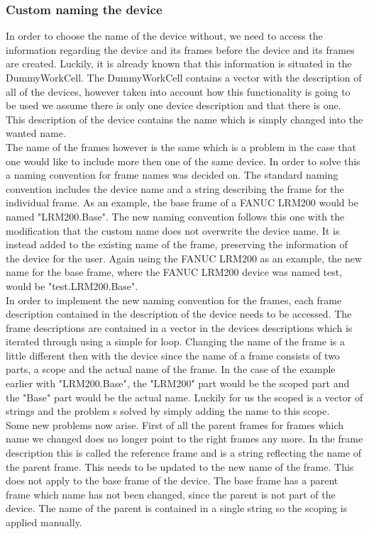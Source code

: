 \subsubsection{Custom naming the device}
In order to choose the name of the device without, we need to access the information regarding the device and its frames before the device and its frames are created. Luckily, it is already known that this information is situated in the DummyWorkCell. The DummyWorkCell contains a vector with the description of all of the devices, however taken into account how this functionality is going to be used we assume there is only one device description and that there is one. This description of the device contains the name which is simply changed into the wanted name.\\

The name of the frames however is the same which is a problem in the case that one would like to include more then one of the same device. In order to solve this a naming convention for frame names was decided on. The standard naming convention includes the device name and a string describing the frame for the individual frame. As an example, the base frame of a FANUC LRM200 would be named "LRM200.Base". The new naming convention follows this one with the modification that the custom name does not overwrite the device name. It is instead added to the existing name of the frame, preserving the information of the device for the user. Again using the FANUC LRM200 as an example, the new name for the base frame, where the FANUC LRM200 device was named test, would be "test.LRM200.Base".\\

In order to implement the new naming convention for the frames, each frame description contained in the description of the device needs to be accessed. The frame descriptions are contained in a vector in the devices descriptions which is iterated through using a simple for loop. Changing the name of the frame is a little different then with the device since the name of a frame consists of two parts, a scope and the actual name of the frame. In the case of the example earlier with "LRM200.Base", the "LRM200" part would be the scoped part and the "Base" part would be the actual name. Luckily for us the scoped is a vector of strings and the problem s solved by simply adding the name to this scope.\\

Some new problems now arise. First of all the parent frames for frames which name we changed does no longer point to the right frames any more. In the frame description this is called the reference frame and is a string reflecting the name of the parent frame. This needs to be updated to the new name of the frame. This does not apply to the base frame of the device. The base frame has a parent frame which name has not been changed, since the parent is not part of the device. The name of the parent is contained in a single string so the scoping is applied manually.\\

